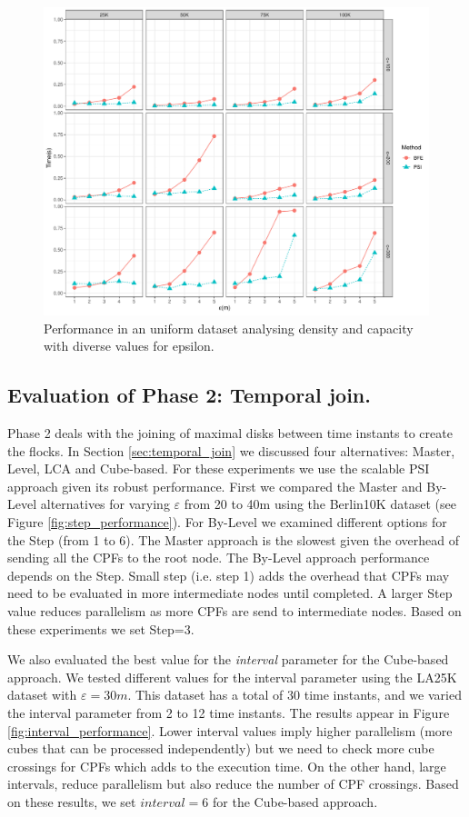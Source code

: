 \begin{figure}
    \centering
    \includegraphics[width=\linewidth]{figures/plots/05_uniform_performance/uniform_performance.pdf}
    \caption{Performance in an uniform dataset analysing density and capacity with diverse values for epsilon.}\label{fig:uniform_performance}
\end{figure}

\subsection{Evaluation of Phase 2: Temporal join.}
Phase 2 deals with the joining of maximal disks between time instants to create the flocks. In Section \ref{sec:temporal_join} we discussed four alternatives: Master, Level, LCA and Cube-based. For these experiments we use the scalable PSI approach given its robust performance. First we compared the Master and By-Level alternatives for varying $\varepsilon$ from 20 to 40m using the Berlin10K dataset (see Figure \ref{fig:step_performance}). For By-Level we examined different options for the Step (from 1 to 6). The Master approach is the slowest given the overhead of sending all the CPFs to the root node. The By-Level approach performance depends on the Step. Small step (i.e. step 1) adds the overhead that CPFs may need to be evaluated in more intermediate nodes until completed. A larger Step value reduces parallelism as more CPFs are send to intermediate nodes. Based on these experiments we set Step=3.

We also evaluated the best value for the \textit{interval} parameter for the Cube-based approach. We tested different values for the interval parameter using the LA25K dataset with $\varepsilon=30m$. This dataset has a total of 30 time instants, and we varied the interval parameter from 2 to 12 time instants.  The results appear in Figure \ref{fig:interval_performance}. Lower interval values imply higher parallelism (more cubes that can be processed independently) but we need to check more cube crossings for CPFs which adds to the execution time. On the other hand, large intervals, reduce parallelism but also reduce the number of CPF crossings. Based on these results, we set $interval=6$ for the Cube-based approach.   

